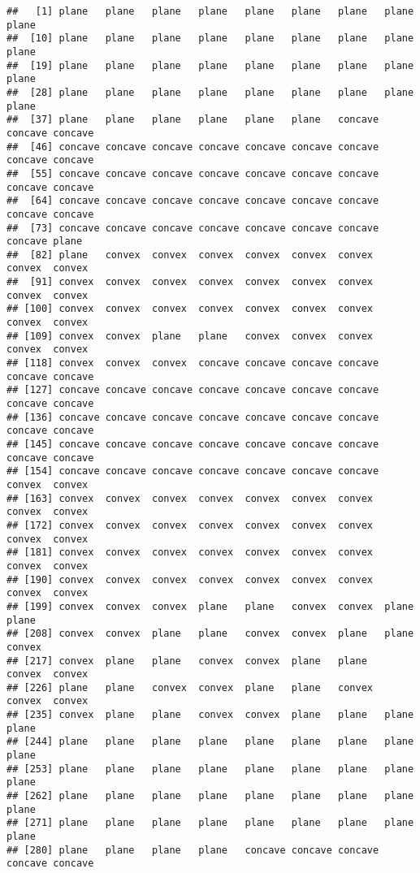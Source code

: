 \documentclass[
]{article}
\begin{document}
\begin{verbatim}
##   [1] plane   plane   plane   plane   plane   plane   plane   plane   plane  
##  [10] plane   plane   plane   plane   plane   plane   plane   plane   plane  
##  [19] plane   plane   plane   plane   plane   plane   plane   plane   plane  
##  [28] plane   plane   plane   plane   plane   plane   plane   plane   plane  
##  [37] plane   plane   plane   plane   plane   plane   concave concave concave
##  [46] concave concave concave concave concave concave concave concave concave
##  [55] concave concave concave concave concave concave concave concave concave
##  [64] concave concave concave concave concave concave concave concave concave
##  [73] concave concave concave concave concave concave concave concave plane  
##  [82] plane   convex  convex  convex  convex  convex  convex  convex  convex 
##  [91] convex  convex  convex  convex  convex  convex  convex  convex  convex 
## [100] convex  convex  convex  convex  convex  convex  convex  convex  convex 
## [109] convex  convex  plane   plane   convex  convex  convex  convex  convex 
## [118] convex  convex  convex  concave concave concave concave concave concave
## [127] concave concave concave concave concave concave concave concave concave
## [136] concave concave concave concave concave concave concave concave concave
## [145] concave concave concave concave concave concave concave concave concave
## [154] concave concave concave concave concave concave concave convex  convex 
## [163] convex  convex  convex  convex  convex  convex  convex  convex  convex 
## [172] convex  convex  convex  convex  convex  convex  convex  convex  convex 
## [181] convex  convex  convex  convex  convex  convex  convex  convex  convex 
## [190] convex  convex  convex  convex  convex  convex  convex  convex  convex 
## [199] convex  convex  convex  plane   plane   convex  convex  plane   plane  
## [208] convex  convex  plane   plane   convex  convex  plane   plane   convex 
## [217] convex  plane   plane   convex  convex  plane   plane   convex  convex 
## [226] plane   plane   convex  convex  plane   plane   convex  convex  convex 
## [235] convex  plane   plane   convex  convex  plane   plane   plane   plane  
## [244] plane   plane   plane   plane   plane   plane   plane   plane   plane  
## [253] plane   plane   plane   plane   plane   plane   plane   plane   plane  
## [262] plane   plane   plane   plane   plane   plane   plane   plane   plane  
## [271] plane   plane   plane   plane   plane   plane   plane   plane   plane  
## [280] plane   plane   plane   plane   concave concave concave concave concave

\end{verbatim}
\end{document}

